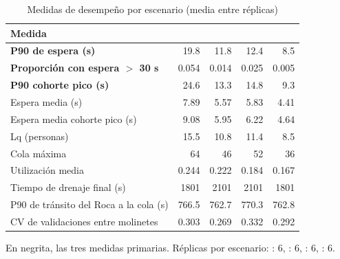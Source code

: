\begin{table}[H]
\centering
\caption{Medidas de desempeño por escenario (media entre réplicas)}
\label{tab:resultados-escenarios}
\small
\begin{tabular}{@{}lrrrr@{}}
\toprule
Medida & \EO{} & \EI{} & \ET{} & \EIT{} \\
\midrule
\textbf{P90 de espera (s)} & \num{19.8} & \num{11.8} & \num{12.4} & \num{8.5} \\
\textbf{Proporción con espera $>$ 30 s} & \num{0.054} & \num{0.014} & \num{0.025} & \num{0.005} \\
\textbf{P90 cohorte pico (s)} & \num{24.6} & \num{13.3} & \num{14.8} & \num{9.3} \\
\midrule
Espera media (s) & \num{7.89} & \num{5.57} & \num{5.83} & \num{4.41} \\
Espera media cohorte pico (s) & \num{9.08} & \num{5.95} & \num{6.22} & \num{4.64} \\
Lq (personas) & \num{15.5} & \num{10.8} & \num{11.4} & \num{8.5} \\
Cola máxima & \num{64} & \num{46} & \num{52} & \num{36} \\
Utilización media & \num{0.244} & \num{0.222} & \num{0.184} & \num{0.167} \\
Tiempo de drenaje final (s) & \num{1801} & \num{2101} & \num{2101} & \num{1801} \\
P90 de tránsito del Roca a la cola (s) & \num{766.5} & \num{762.7} & \num{770.3} & \num{762.8} \\
CV de validaciones entre molinetes & \num{0.303} & \num{0.269} & \num{0.332} & \num{0.292} \\
\bottomrule
\end{tabular}

\smallskip
\footnotesize En negrita, las tres medidas primarias. Réplicas por escenario: \EO{}: 6, \EI{}: 6, \ET{}: 6, \EIT{}: 6.
\end{table}
